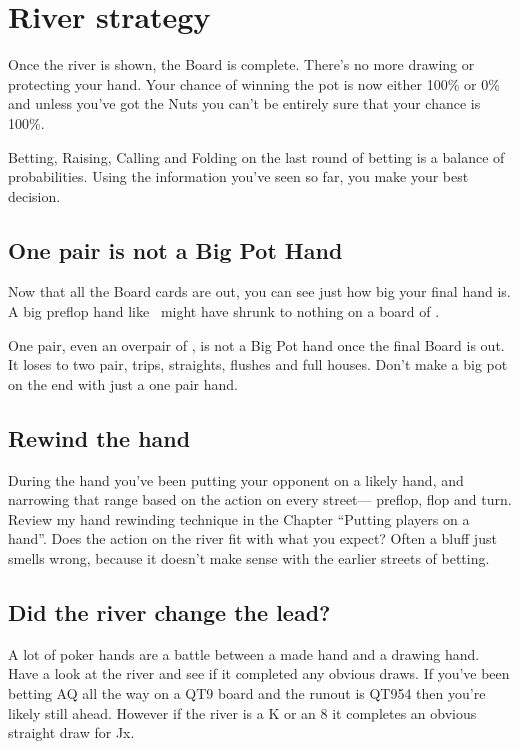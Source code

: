 \chapter{River strategy}


Once the river is shown, the Board is complete. There's no more
drawing or protecting your hand. Your chance of winning the pot
is now either 100\% or 0\% and unless you've got the Nuts you
can't be entirely sure that your chance is 100\%.

Betting, Raising, Calling and Folding on the last round of betting
is a balance of probabilities. Using the information you've seen
so far, you make your best decision.

\section{One pair is not a Big Pot Hand}

Now that all the Board cards are out, you can see just how big
your final hand is. A big preflop hand like \Ah\Kh\ might have
shrunk to nothing on a board of \Jc\eigh\fivec\ninec\tenc.

One pair, even an overpair of \Ah\As, is not a Big Pot hand once
the final Board is out. It loses to two pair, trips, straights,
flushes and full houses. Don't make a big pot on the end with
just a one pair hand.

\section{Rewind the hand}

During the hand you've been putting your opponent on a likely
hand, and narrowing that range based on the action on every street---
preflop, flop and turn. Review my hand rewinding technique in the
Chapter ``Putting players on a hand''. Does the action on the river
fit with what you expect? Often a bluff just smells wrong, because
it doesn't make sense with the earlier streets of betting.

\section{Did the river change the lead?}

A lot of poker hands are a battle between a made hand and a drawing
hand. Have a look at the river and see if it completed any obvious
draws. If you've been betting AQ all the way on a QT9 board and the
runout is QT954 then you're likely still ahead. However if the river
is a K or an 8 it completes an obvious straight draw for Jx.

